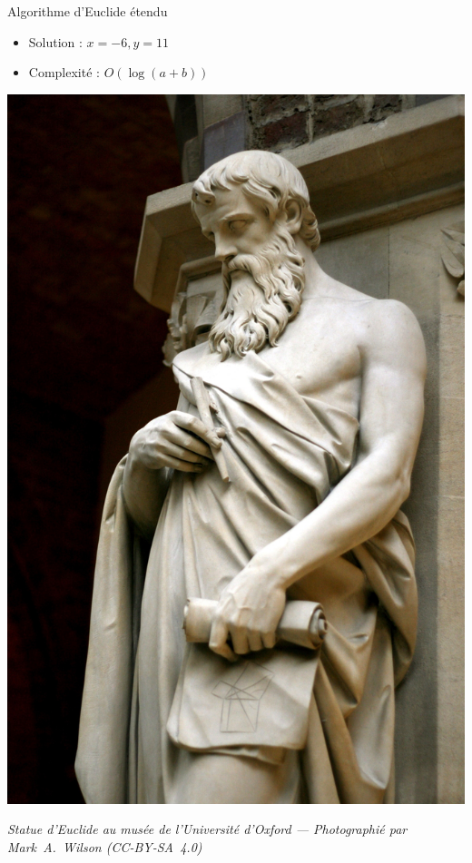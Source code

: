 \documentclass{main}
\begin{document}
\begin{frame}{Algorithme d’Euclide étendu}
\begin{minipage}{\dimexpr.7\textwidth-2em}
{        \begin{itemize}
            \item Solution : \(x = -6, y = 11\)
            \item Complexité : \(O(\log(a + b))\)
        \end{itemize}
        }
    \end{minipage}\hfill%
    \begin{minipage}{.3\textwidth}
        \raggedleft
        \includegraphics[width=\linewidth]{figs/euclid}
        
        \vspace{.5em}
        \tiny\itshape
        Statue d’Euclide au musée de l’Université d'Oxford --- Photographié par Mark~A.~Wilson (CC-BY-SA~4.0)
    \end{minipage}
\end{frame}
\end{document}
